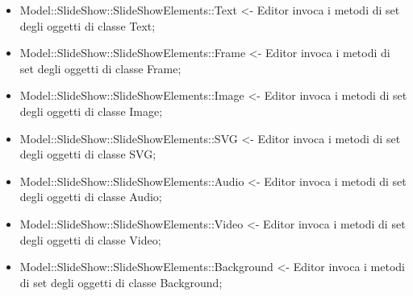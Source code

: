 {\begin{itemize}
			\item Model::\-SlideShow::\-SlideShowElements::\-Text <- Editor invoca i metodi di set degli oggetti di classe Text;
			\item Model::\-SlideShow::\-SlideShowElements::\-Frame <- Editor invoca i metodi di set degli oggetti di classe Frame;
			\item Model::\-SlideShow::\-SlideShowElements::\-Image <- Editor invoca i metodi di set degli oggetti di classe Image;
			\item Model::\-SlideShow::\-SlideShowElements::\-SVG <- Editor invoca i metodi di set degli oggetti di classe SVG;
			\item Model::\-SlideShow::\-SlideShowElements::\-Audio <- Editor invoca i metodi di set degli oggetti di classe Audio;
			\item Model::\-SlideShow::\-SlideShowElements::\-Video <- Editor invoca i metodi di set degli oggetti di classe Video;
			\item Model::\-SlideShow::\-SlideShowElements::\-Background <- Editor invoca i metodi di set degli oggetti di classe Background;
		\end{itemize} 
	}

